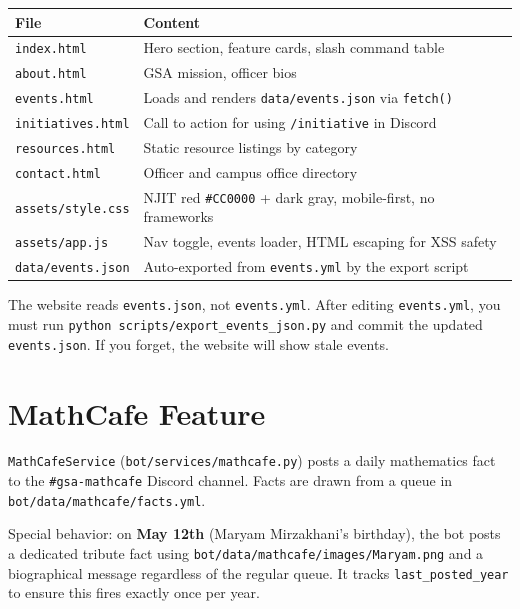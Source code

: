 \documentclass[12pt,letterpaper]{article}
\begin{document}
\begin{center}
\begin{tabular}{ll}
\toprule
\textbf{File} & \textbf{Content} \\
\midrule
\texttt{index.html} & Hero section, feature cards, slash command table \\
\texttt{about.html} & GSA mission, officer bios \\
\texttt{events.html} & Loads and renders \texttt{data/events.json} via \texttt{fetch()} \\
\texttt{initiatives.html} & Call to action for using \texttt{/initiative} in Discord \\
\texttt{resources.html} & Static resource listings by category \\
\texttt{contact.html} & Officer and campus office directory \\
\texttt{assets/style.css} & NJIT red \texttt{\#CC0000} + dark gray, mobile-first, no frameworks \\
\texttt{assets/app.js} & Nav toggle, events loader, HTML escaping for XSS safety \\
\texttt{data/events.json} & Auto-exported from \texttt{events.yml} by the export script \\
\bottomrule
\end{tabular}
\end{center}

\begin{warningbox}
The website reads \texttt{events.json}, not \texttt{events.yml}. After editing
\texttt{events.yml}, you must run \texttt{python scripts/export\_events\_json.py}
and commit the updated \texttt{events.json}. If you forget, the website will
show stale events.
\end{warningbox}

\section{MathCafe Feature}

\texttt{MathCafeService} (\texttt{bot/services/mathcafe.py}) posts a daily
mathematics fact to the \texttt{\#gsa-mathcafe} Discord channel. Facts are drawn
from a queue in \texttt{bot/data/mathcafe/facts.yml}.

Special behavior: on \textbf{May 12th} (Maryam Mirzakhani's birthday), the bot
posts a dedicated tribute fact using \texttt{bot/data/mathcafe/images/Maryam.png}
and a biographical message regardless of the regular queue. It tracks
\texttt{last\_posted\_year} to ensure this fires exactly once per year.
\end{document}
